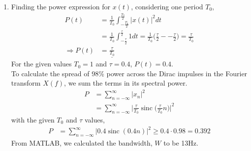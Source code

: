 \documentclass[11pt]{article}
\DeclareMathOperator{\sinc}{sinc}
\begin{document}
\begin{enumerate}[label=(\alph*)]
    \item %
    Finding the power expression for $x(t)$, considering one period $T_0$,
    \begin{align*}
        P(t) &= \frac{1}{T_0} \int^{\frac{T_0}{2}}_{-\frac{T_0}{2}} |x(t)|^2 dt\\
        &= \frac{1}{T_0} \int^{\frac{\tau}{2}}_{-\frac{\tau}{2}} 1 dt = \frac{1}{T_0} \Big(\frac{\tau}{2} - -\frac{\tau}{2}\Big) = \frac{\tau}{T_0}\\
        \Rightarrow P(t) &= \underline{\frac{\tau}{T_0}} 
    \end{align*}
    For the given values $T_0 = 1$ and $\tau=0.4$, $P(t)=0.4$.\\
    
    To calculate the spread of 98\% power across the Dirac impulses in the Fourier transform $X(f)$, we sum the terms in its spectral power.
    \begin{align*}
        P &= \sum_{n = -\infty}^{\infty} |x_n|^2\\
        &= \sum_{n = -\infty}^{\infty}\Biggr|\frac{\tau}{T_0}\sinc \Big(\frac{\tau}{T_0}n\Big)\Biggr|^2
    \end{align*}
    with the given $T_0$ and $\tau$ values,
    \begin{align*}
        P &= \sum_{n = -\infty}^{\infty}\Big|0.4\sinc(0.4n)\Big|^2 \geq 0.4 \cdot 0.98 = 0.392
    \end{align*}
    From MATLAB, we calculated the bandwidth, $W$ to be 13Hz.
    

\end{enumerate}
\end{document}
